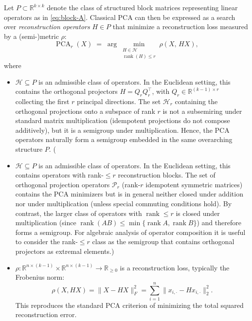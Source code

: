 Let \(P \subset \mathbb{R}^{k \times k}\) denote the class of structured block matrices representing linear operators as in \eqref{eq:block-A}. Classical PCA can then be expressed as a search over \emph{reconstruction operators} \(H \in P\) that minimize a reconstruction loss measured by a (semi-)metric \(\rho\):
\begin{equation} \label{eq:general-pca}
\operatorname{PCA}_r(X) \;=\; \arg\min_{\substack{H\in\mathcal{H}\\ \operatorname{rank}(H)\le r}} \rho(X,\, H X),
\end{equation}
where
\begin{itemize}
    \item \(\mathcal{H} \subseteq P\) is an admissible class of operators. In the Euclidean setting, this contains the orthogonal projectors \(H = Q_r Q_r^\top\), with \(Q_r \in \mathbb{R}^{(k-1) \times r}\) collecting the first \(r\) principal directions. The set $\mathcal{H}_r$ containing the orthogonal projections onto a subspace of rank $r$ is not a subsemiring under standard matrix multiplication (idempotent projections do not compose additively), but it is a semigroup under multiplication. Hence, the PCA operators naturally form a semigroup embedded in the same overarching structure \(P\).
    (\item \(\mathcal{H} \subseteq P\) is an admissible class of operators. In the Euclidean setting, this contains operators with rank-$\le r$ reconstruction blocks. The set of orthogonal projection operators $\mathcal{P}_r$ (rank-$r$ idempotent symmetric matrices) contains the PCA minimizers but is in general neither closed under addition nor under multiplication (unless special commuting conditions hold). By contrast, the larger class of operators with $\operatorname{rank}\le r$ is closed under multiplication (since $\operatorname{rank}(AB)\le\min\{\operatorname{rank}A,\operatorname{rank}B\}$) and therefore forms a semigroup. For algebraic analysis of operator composition it is useful to consider the rank-$\le r$ class as the semigroup that contains orthogonal projectors as extremal elements.)
    \item \(\rho : \mathbb{R}^{n \times (k-1)} \times \mathbb{R}^{n \times (k-1)} \to \mathbb{R}_{\ge 0}\) is a reconstruction loss, typically the Frobenius norm:
    \[
        \rho(X, HX) = \| X - HX \|_F^2 = \sum_{i=1}^n \| x_{i,\cdot} - H x_{i,\cdot} \|_2^2.
    \]
    This reproduces the standard PCA criterion of minimizing the total squared reconstruction error.
\end{itemize}

